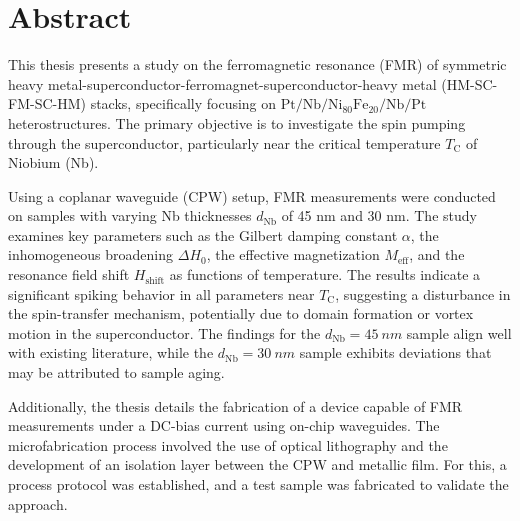 \chapter{Abstract}
\begin{sloppy}
This thesis presents a study on the ferromagnetic resonance (FMR) of symmetric heavy metal-\allowbreak superconductor-\allowbreak ferromagnet-\allowbreak superconductor-\allowbreak heavy metal (HM-SC-FM-SC-HM) stacks, specifically focusing on $\mathrm{Pt}/\allowbreak\mathrm{Nb}/\allowbreak{\mathrm{Ni}}_{80}{\mathrm{Fe}}_{20}/\allowbreak\mathrm{Nb}/\allowbreak \mathrm{Pt}$ heterostructures. The primary objective is to investigate the spin pumping through the superconductor, particularly near the critical temperature $T_\textrm{C}$ of Niobium (Nb).
\end{sloppy}

Using a coplanar waveguide (CPW) setup, FMR measurements were conducted on samples with varying Nb thicknesses $d_\textrm{Nb}$ of 45 nm and 30 nm. The study examines key parameters such as the Gilbert damping constant $\alpha$, the inhomogeneous broadening $\Delta H_0$, the effective magnetization $M_\textrm{eff}$, and the resonance field shift $H_\textrm{shift}$ as functions of temperature. The results indicate a significant spiking behavior in all parameters near $T_\textrm{C}$, suggesting a disturbance in the spin-transfer mechanism, potentially due to domain formation or vortex motion in the superconductor. The findings for the $d_\textrm{Nb} = \SI{45}{nm}$ sample align well with existing literature, while the $d_\textrm{Nb} = \SI{30}{nm}$ sample exhibits deviations that may be attributed to sample aging.

Additionally, the thesis details the fabrication of a device capable of FMR measurements under a DC-bias current using on-chip waveguides. The microfabrication process involved the use of optical lithography and the development of an isolation layer between the CPW and metallic film. For this, a process protocol was established, and a test sample was fabricated to validate the approach.